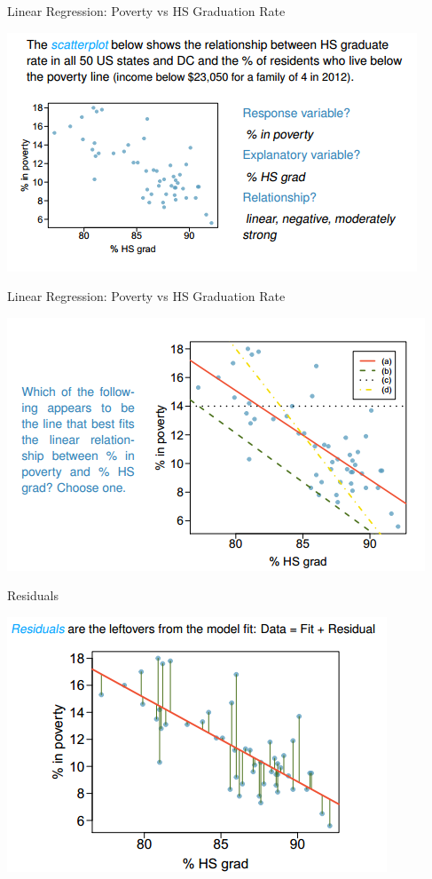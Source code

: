 \documentclass{beamer}
\begin{document}
\begin{frame}{Linear Regression: Poverty vs HS Graduation Rate}
    \begin{center}
        \includegraphics[scale=0.6]{povertyVsHSGradRate1.png}
    \end{center}
\end{frame}
\begin{frame}{Linear Regression: Poverty vs HS Graduation Rate}
    \begin{center}
        \includegraphics[scale=0.6]{povertyVsHSGradRate2.png}
    \end{center}
\end{frame}
\begin{frame}{Residuals}
    \begin{center}
        \includegraphics[scale=0.6]{residuals1.png}
    \end{center}
\end{frame}
\end{document}
